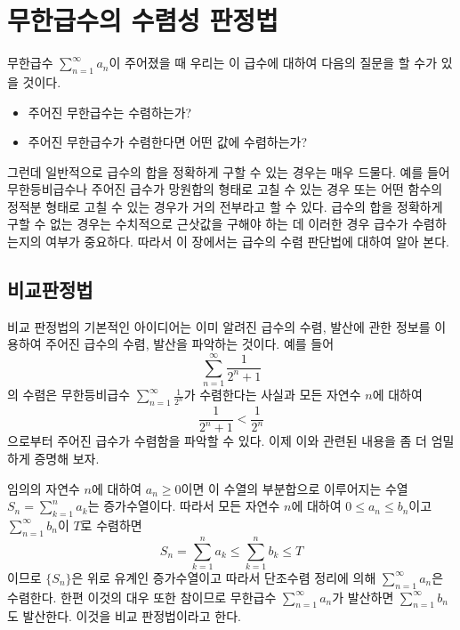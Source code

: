 \documentclass[11pt, a4paper]{book}
\begin{document}
\chapter{\Huge 무한급수의 수렴성 판정법}
  무한급수 $\displaystyle \sum_{n=1}^{\infty}a_{n}$이 주어졌을 때 우리는 이 급수에 대하여 다음의 질문을 할 수가 있을 것이다.
  \begin{itemize}
  	\item 주어진 무한급수는 수렴하는가?
  	\item 주어진 무한급수가 수렴한다면 어떤 값에 수렴하는가?
  \end{itemize}

그런데 일반적으로 급수의 합을 정확하게 구할 수 있는 경우는 매우 드물다. 예를 들어 무한등비급수나 주어진 급수가 망원합의 형태로 고칠 수 있는 경우 또는 어떤 함수의 정적분 형태로 고칠 수 있는 경우가 거의 전부라고 할 수 있다. 급수의 합을 정확하게 구할 수 없는 경우는 수치적으로 근삿값을 구해야 하는 데 이러한 경우 급수가 수렴하는지의 여부가 중요하다. 따라서 이 장에서는 급수의 수렴 판단법에 대하여 알아 본다.

\section{비교판정법}
 비교 판정법의 기본적인 아이디어는 이미 알려진 급수의 수렴, 발산에 관한 정보를 이용하여 주어진 급수의 수렴, 발산을 파악하는 것이다. 예를 들어 
 \begin{equation*}
 	\sum_{n=1}^{\infty} \frac{1}{2^{n}+1}
 \end{equation*}
의 수렴은 무한등비급수 $\sum_{n=1}^{\infty} \frac{1}{2^n}$가 수렴한다는 사실과 모든 자연수 $n$에 대하여
\begin{equation*}
	\frac{1}{2^{n}+1} < \frac{1}{2^{n}}
\end{equation*}
으로부터 주어진 급수가 수렴함을 파악할 수 있다. 이제 이와 관련된 내용을 좀 더 엄밀하게 증명해 보자.

 임의의 자연수 $n$에 대하여 $a_{n}\geq 0$이면 이 수열의 부분합으로 이루어지는 수열 $S_{n} = \displaystyle \sum_{k=1}^{n}a_{k}$는 증가수열이다. 따라서 모든 자연수 $n$에 대하여 $0 \leq a_{n} \leq b_{n}$이고 $\displaystyle \sum_{n=1}^{\infty}b_{n}$이 $T$로 수렴하면
 \begin{equation*}
 	S_{n} = \sum_{k=1}^{n} a_{k} \le \sum_{k=1}^{n}b_{k} \le T
 \end{equation*}
이므로 $\{S_{n}\}$은 위로 유계인 증가수열이고 따라서 단조수렴 정리에 의해 $\displaystyle \sum_{n=1}^{\infty}a_{n}$은 수렴한다. 한편 이것의 대우 또한 참이므로 무한급수 $\displaystyle \sum_{n=1}^{\infty}a_{n}$가 발산하면 $\displaystyle \sum_{n=1}^{\infty}b_{n}$도 발산한다. 이것을 {\color{red}비교 판정법}이라고 한다.
\end{document}
